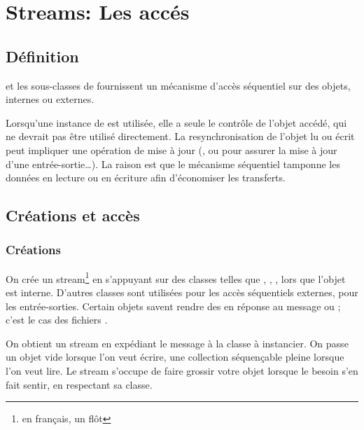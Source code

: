 \ifx\wholebook\relax\else


\fi

\chapter{Streams: Les acc\'es}


\section{D\'efinition}

 et les sous-classes de  fournissent un m\'ecanisme d'acc\`es
s\'equentiel sur des objets, internes ou externes.

Lorsqu'une instance de   est utilis\'ee,  elle a seule le contr\^ole de l'objet acc\'ed\'e, qui ne devrait pas \^etre utilis\'e directement.  La resynchronisation de l'objet lu ou \'ecrit peut impliquer une op\'eration de mise \`a jour (,  ou  pour assurer la mise \`a jour d'une entr\'ee-sortie\ldots). La raison est que le m\'ecanisme s\'equentiel tamponne les donn\'ees en lecture ou en \'ecriture afin d'\'economiser les transferts.

\section{Cr\'eations et acc\`es}

\subsection{Cr\'eations}
On cr\'ee un stream\footnote{en fran\c{c}ais, un fl\^ot} en s'appuyant sur
des classes telles que , , ,
lors que l'objet est interne. D'autres classes sont utilis\'ees pour les acc\`es s\'equentiels externes, pour les entr\'ee-sorties. Certain objets  savent rendre des  en r\'eponse au message  ou ; c'est le cas des fichiers
.

On obtient un stream en exp\'ediant le message  \`a la classe \`a instancier. On  passe un objet vide lorsque l'on veut \'ecrire, une collection s\'equen\c{c}able pleine lorsque l'on veut lire. Le stream s'occupe de faire grossir votre objet lorsque le besoin s'en fait sentir, en respectant sa classe.


